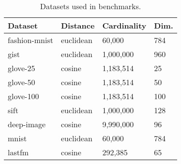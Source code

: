 \begin{table}[!t]
    \caption{Datasets used in benchmarks.}
    \label{table:datasets:summary}
    \vskip 0.15in
    \begin{center}
        \begin{small}
            \begin{sc}
                \begin{tabular}{|l|l|l|l|}
                    \hline
                    \textbf{Dataset} & \textbf{Distance}  &\textbf{Cardinality}  & \textbf{Dim.}  \\
                    \hline
                    fashion-mnist    & euclidean              & 60,000             & 784       \\
                    \hline 
                    gist             & euclidean              & 1,000,000          & 960       \\
                    \hline
                    glove-25         & cosine              & 1,183,514          & 25        \\
                    \hline
                    glove-50         & cosine              & 1,183,514          & 50        \\
                    \hline
                    glove-100        & cosine              & 1,183,514          & 100       \\
                    \hline
                    sift             & euclidean              & 1,000,000          & 128       \\
                    \hline
                    deep-image       & cosine              & 9,990,000          & 96        \\
                    \hline
                    mnist            & euclidean              & 60,000             & 784       \\
                    \hline
                    lastfm           & cosine              & 292,385            & 65        \\
                    \hline
                \end{tabular}
            \end{sc}
        \end{small}
    \end{center}
    \vskip -0.1in
\end{table}



